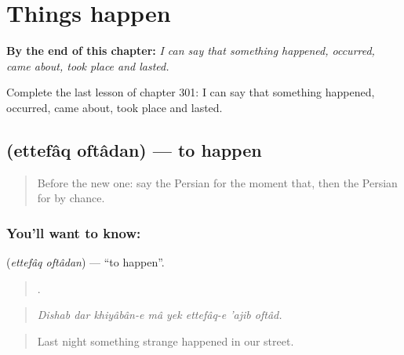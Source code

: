 
\chapter{Things happen}
\label{ch:fa-things-happen}

\begin{chapteropening}
\textbf{By the end of this chapter:} \emph{I can say that something happened, occurred, came about, took place and lasted.}

Complete the last lesson of chapter 301: I can say that something happened, occurred, came about, took place and lasted.
\end{chapteropening}

\section[\texorpdfstring{\fa{اتفاق} \fa{افتادن} (ettefâq oftâdan)}{اتفاق افتادن (ettefâq oftâdan)}]{  (ettefâq oftâdan) — to happen}

\label{lesson:FA-C301-ettefaq-oftadan}



\begin{quote}
Before the new one: say the Persian for the moment that, then the Persian for by chance.
\end{quote}

\subsection*{You'll want to know:  }
\textbf{ } (\emph{ettefâq oftâdan}) — \textquotedblleft{}to happen\textquotedblright{}.

\begin{quote}
       .
\end{quote}

\begin{quote}
\emph{Dishab dar khiyâbân-e mâ yek ettefâq-e 'ajib oftâd.}
\end{quote}

\begin{quote}
Last night something strange happened in our street.
\end{quote}

